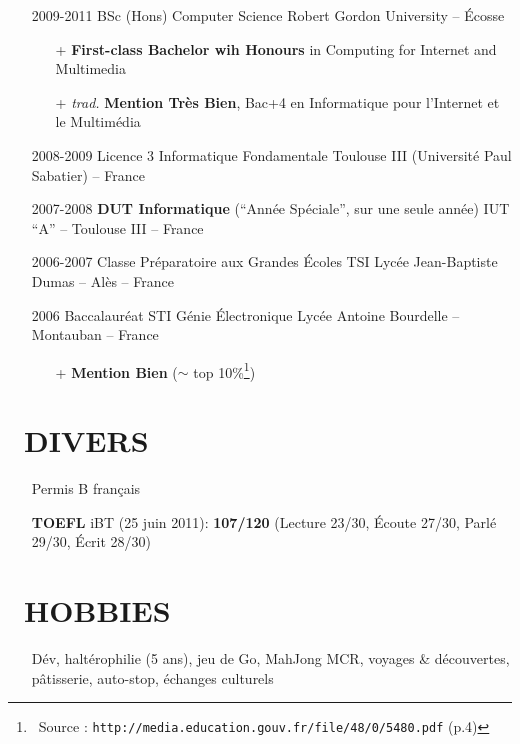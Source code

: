 \documentclass{res}
\begin{document}
\begin{resume}
\begin{itemize}
\item[] 2009-2011 \tabto{2cm} BSc (Hons) Computer Science \hfill Robert Gordon University -- \'Ecosse  
	\begin{itemize}
		\item[+] \textbf{First-class Bachelor wih Honours} in Computing for Internet and Multimedia
		\item[+] \textit{trad.} \textbf{Mention Tr\`es Bien}, Bac+4 en Informatique pour l'Internet et le Multim\'edia
	\end{itemize}
	
\item[] 2008-2009 \tabto{2cm} Licence 3 Informatique Fondamentale \hfill Toulouse III (Universit\'e Paul Sabatier) -- France

\item[] 2007-2008 \tabto{2cm} \textbf{DUT Informatique} (``Ann\'ee Sp\'eciale'', sur une seule ann\'ee) \hfill IUT ``A'' -- Toulouse III -- France

\item[] 2006-2007 \tabto{2cm} Classe Pr\'eparatoire aux Grandes \'Ecoles TSI \hfill Lyc\'ee Jean-Baptiste Dumas -- Al\`es -- France
	
\item[] 2006 \tabto{2cm} Baccalaur\'eat STI G\'enie \'Electronique \hfill Lyc\'ee Antoine Bourdelle -- Montauban -- France
	\begin{itemize}
		\item[+] \textbf{Mention Bien} ($\sim$ top 10\%\footnote{~Source : \texttt{http://media.education.gouv.fr/file/48/0/5480.pdf} (p.4)})
	\end{itemize}
\end{itemize}

\section{\faMagic~DIVERS}
	\begin{itemize}
		\item[] Permis B fran\c{c}ais
		\item[] \textbf{TOEFL} iBT (25 juin 2011): \textbf{107/120} (Lecture 23/30, \'Ecoute 27/30, Parl\'e 29/30, \'Ecrit 28/30)		
		    \end{itemize} 
 
\section{\faGamepad~HOBBIES}
	\begin{itemize}
		\item[] D\'ev, halt\'erophilie (5 ans), jeu de Go, MahJong MCR, voyages \& d\'ecouvertes, p\^atisserie, auto-stop, \'echanges culturels
	\end{itemize}


\end{resume}
\end{document}
